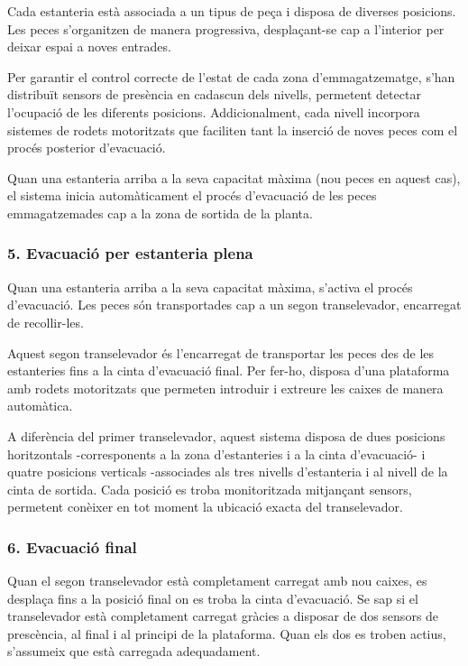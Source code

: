 \documentclass[a4paper,11pt,DIV=13,headings=normal,abstract=true,twoside=semi]{article}
\begin{document}
Cada estanteria està associada a un tipus de peça i disposa de diverses posicions. Les peces s'organitzen de manera progressiva, desplaçant-se cap a l'interior per deixar espai a noves entrades.


Per garantir el control correcte de l'estat de cada zona d'emmagatzematge, s'han distribuït sensors de presència en cadascun dels nivells, permetent detectar l'ocupació de les diferents posicions. Addicionalment, cada nivell incorpora sistemes de rodets motoritzats que faciliten tant la inserció de noves peces com el procés posterior d'evacuació.

Quan una estanteria arriba a la seva capacitat màxima (nou peces en aquest cas), el sistema inicia automàticament el procés d'evacuació de les peces emmagatzemades cap a la zona de sortida de la planta.

\subsubsection*{5. Evacuació per estanteria plena}


Quan una estanteria arriba a la seva capacitat màxima, s'activa el procés d'evacuació. Les peces són transportades cap a un segon transelevador, encarregat de recollir-les.

Aquest segon transelevador és l'encarregat de transportar les peces des de les estanteries fins a la cinta d'evacuació final. Per fer-ho, disposa d'una plataforma amb rodets motoritzats que permeten introduir i extreure les caixes de manera automàtica.

A diferència del primer transelevador, aquest sistema disposa de dues posicions horitzontals -corresponents a la zona d'estanteries i a la cinta d'evacuació- i quatre posicions verticals -associades als tres nivells d'estanteria i al nivell de la cinta de sortida. Cada posició es troba monitoritzada mitjançant sensors, permetent conèixer en tot moment la ubicació exacta del transelevador.

\subsubsection*{6. Evacuació final}
Quan el segon transelevador està completament carregat amb nou caixes, es desplaça fins a la posició final on es troba la cinta d'evacuació. Se sap si el transelevador està completament carregat gràcies a disposar de dos sensors de prescència, al final i al principi de la plataforma. Quan els dos es troben actius, s'assumeix que està carregada adequadament.
\end{document}
